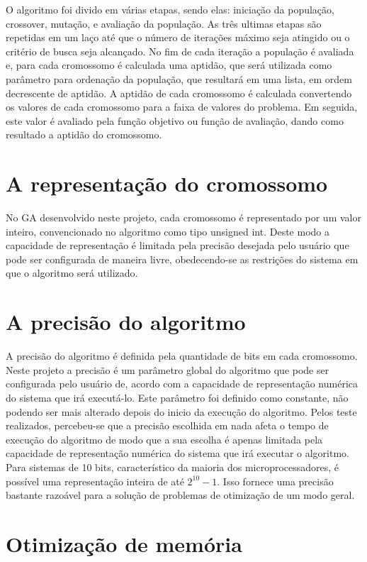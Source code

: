 \documentclass[
    12pt,               %
    twoside,            %
    a4paper,            %
    english,            %
    french,             %
    spanish,            %
    brazil,             %
    ]{abntex2}
\begin{document}
 O algoritmo foi divido em várias etapas, sendo elas: iniciação da população, crossover, mutação, e avaliação da população. As três ultimas etapas são repetidas em um laço até que o número de iterações máximo seja atingido ou o critério de busca seja  alcançado.
 No fim de cada iteração a população é avaliada e, para cada cromossomo é calculada uma aptidão, que será utilizada como parâmetro para ordenação da população, que resultará em uma lista, em ordem decrescente de aptidão. A aptidão de cada cromossomo é calculada convertendo os valores de cada cromossomo para a faixa de valores do problema. Em seguida, este valor é avaliado pela função objetivo ou função de avaliação, dando como resultado a aptidão do cromossomo. 

\section{A representação do cromossomo}

  No GA desenvolvido neste projeto, cada cromossomo é representado por um valor inteiro, convencionado no algoritmo como tipo unsigned int. Deste modo a capacidade de representação é limitada pela precisão desejada pelo usuário que pode ser configurada de maneira livre, obedecendo-se as restrições do sistema em que o algoritmo será utilizado.

\section{A precisão do algoritmo}

  A precisão do algoritmo é definida pela quantidade de bits em cada cromossomo. Neste projeto a precisão é um parâmetro global do algoritmo que pode ser configurada pelo usuário de, acordo com a capacidade de representação numérica do sistema que irá executá-lo. Este parâmetro foi definido como constante, não podendo ser mais alterado depois do inicio da execução do algoritmo. Pelos teste realizados, percebeu-se que a precisão escolhida em nada afeta o tempo de execução do algoritmo de modo que a sua escolha é apenas limitada pela capacidade de representação numérica do sistema que irá executar o algoritmo.
  Para sistemas de 10 bits, característico da maioria dos microprocessadores, é possível uma representação inteira de até   $2^10 -1$. Isso fornece uma precisão bastante razoável para a solução de problemas de otimização de um modo geral.

\section{Otimização de memória}
\end{document}
